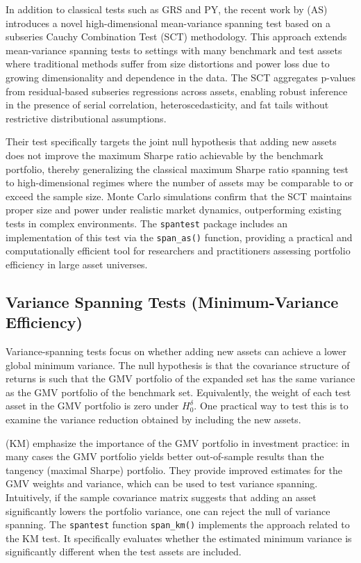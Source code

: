 In addition to classical tests such as GRS and PY, the recent work by
\citet{ArdiaSessinou2025} (AS) introduces a novel high-dimensional
mean-variance spanning test based on a subseries Cauchy Combination Test
(SCT) methodology. This approach extends mean-variance spanning tests to
settings with many benchmark and test assets where traditional methods
suffer from size distortions and power loss due to growing
dimensionality and dependence in the data. The SCT aggregates p-values
from residual-based subseries regressions across assets, enabling robust
inference in the presence of serial correlation, heteroscedasticity, and
fat tails without restrictive distributional assumptions.

Their test specifically targets the joint null hypothesis that adding
new assets does not improve the maximum Sharpe ratio achievable by the
benchmark portfolio, thereby generalizing the classical maximum Sharpe
ratio spanning test to high-dimensional regimes where the number of
assets may be comparable to or exceed the sample size. Monte Carlo
simulations confirm that the SCT maintains proper size and power under
realistic market dynamics, outperforming existing tests in complex
environments. The \texttt{spantest} package includes an implementation of this
test via the \texttt{span\_as()} function, providing a practical and
computationally efficient tool for researchers and practitioners
assessing portfolio efficiency in large asset universes.

\subsection{Variance Spanning Tests (Minimum-Variance Efficiency)}\label{variance-spanning-tests-minimum-variance-efficiency}

Variance-spanning tests focus on whether adding new assets can achieve a
lower global minimum variance. The null hypothesis is that the
covariance structure of returns is such that the GMV portfolio of the
expanded set has the same variance as the GMV portfolio of the benchmark
set. Equivalently, the weight of each test asset in the GMV portfolio is
zero under \(H_0^{\delta}\). One practical way to test this is to examine
the variance reduction obtained by including the new assets.

\citet{KempfMemmel2006} (KM) emphasize the importance of the GMV portfolio in
investment practice: in many cases the GMV portfolio yields better
out-of-sample results than the tangency (maximal Sharpe) portfolio. They
provide improved estimates for the GMV weights and variance, which can
be used to test variance spanning. Intuitively, if the sample covariance
matrix suggests that adding an asset significantly lowers the portfolio
variance, one can reject the null of variance spanning. The \texttt{spantest}
function \texttt{span\_km()} implements the approach related to the KM test. It
specifically evaluates whether the estimated minimum variance is
significantly different when the test assets are included.

